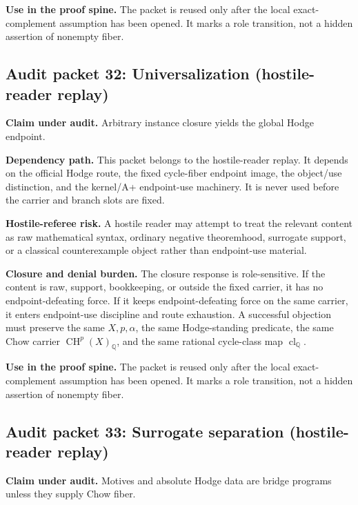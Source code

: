 \documentclass[11pt]{article}
\newcommand{\QQ}{\mathbb{Q}}
\newcommand{\CH}{\operatorname{CH}}
\newcommand{\clQ}{\operatorname{cl}_{\QQ}}
\begin{document}
\par\noindent\textbf{Use in the proof spine.} The packet is reused only after the local exact-complement assumption has been opened. It marks a role transition, not a hidden assertion of nonempty fiber.


\subsection{Audit packet 32: Universalization (hostile-reader replay)}


\par\noindent\textbf{Claim under audit.} Arbitrary instance closure yields the global Hodge endpoint.


\par\noindent\textbf{Dependency path.} This packet belongs to the hostile-reader replay. It depends on the official Hodge route, the fixed cycle-fiber endpoint image, the object/use distinction, and the kernel/A+ endpoint-use machinery. It is never used before the carrier and branch slots are fixed.


\par\noindent\textbf{Hostile-referee risk.} A hostile reader may attempt to treat the relevant content as raw mathematical syntax, ordinary negative theoremhood, surrogate support, or a classical counterexample object rather than endpoint-use material.


\par\noindent\textbf{Closure and denial burden.} The closure response is role-sensitive. If the content is raw, support, bookkeeping, or outside the fixed carrier, it has no endpoint-defeating force. If it keeps endpoint-defeating force on the same carrier, it enters endpoint-use discipline and route exhaustion. A successful objection must preserve the same $X,p,\alpha$, the same Hodge-standing predicate, the same Chow carrier $\CH^p(X)_\QQ$, and the same rational cycle-class map $\clQ$.


\par\noindent\textbf{Use in the proof spine.} The packet is reused only after the local exact-complement assumption has been opened. It marks a role transition, not a hidden assertion of nonempty fiber.


\subsection{Audit packet 33: Surrogate separation (hostile-reader replay)}


\par\noindent\textbf{Claim under audit.} Motives and absolute Hodge data are bridge programs unless they supply Chow fiber.
\end{document}
